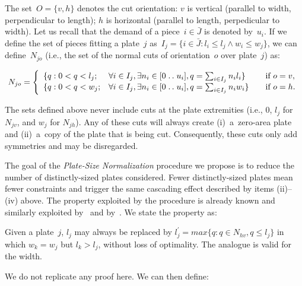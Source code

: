 \documentclass[ppgc,prop-tese,english,formais,babel]{iiufrgs}
\newcommand{\isep}{\mathrel{{.}\,{.}}\nobreak} %
\begin{document}
The set~\(O = \{v, h\}\) denotes the cut orientation: \(v\) is vertical (parallel to width, perpendicular to length); \(h\) is horizontal (parallel to length, perpedicular to width).
Let us recall that the demand of a piece~\(i \in \bar{J}\) is denoted by~\(u_i\).
If we define the set of pieces fitting a plate~\(j\) as~\(I_j = \{i \in \bar{J} : l_i \leq l_j \land w_i \leq w_j \}\), we can define~\(N_{jo}\) (i.e., the set of the normal cuts of orientation~\(o\) over plate~\(j\)) as:

\begin{equation}
N_{jo}= \left\{
\begin{array}{lllr}
  \{q: 0 < q < l_j; & \forall i \in I_j, \exists n_i \in [0 \isep u_i], q = \sum_{i\in I_j} n_i l_i \} & \quad \text{if } o = v,\\
  \{q: 0 < q < w_j; & \forall i \in I_j, \exists n_i \in [0 \isep u_i], q = \sum_{i\in I_j} n_i w_i \} & \quad \text{if } o = h.
\end{array}\right.
\end{equation}

The sets defined above never include cuts at the plate extremities (i.e., \(0\), \(l_j\) for \(N_{jv}\), and \(w_j\) for \(N_{jh}\)).
Any of these cuts will always create (i)~a~zero-area plate and (ii)~a~copy of the plate that is being cut.
Consequently, these cuts only add symmetries and may be disregarded.

The goal of the \emph{Plate-Size Normalization} procedure we propose is to reduce the number of distinctly-sized plates considered.
Fewer distinctly-sized plates mean fewer constraints and trigger the same cascading effect described by items (ii)--(iv) above.
The property exploited by the procedure is already known and similarly exploited by~\citet{alvarez:2009} and by~\citet{dolatabadi:2012}.
We state the property as:


\begin{proposition}
\label{pro:normalization}
Given a plate~\(j\), \(l_j\) may always be replaced by \(l^\prime_j = max\{q : q \in N_{hv}, q \leq l_j\}\) in which \(w_k = w_j\) but \(l_k > l_j\), without loss of optimality.
The analogue is valid for the width.
\end{proposition}

We do not replicate any proof here. We can then define:
\end{document}
